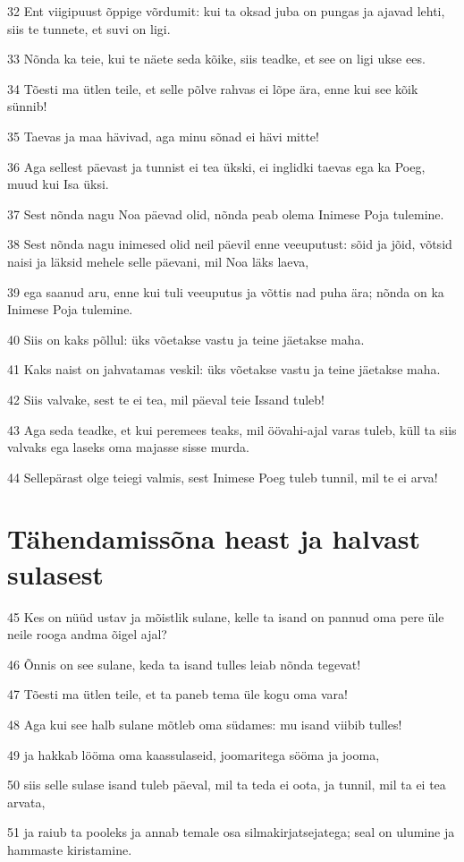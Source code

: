 \par 32 Ent viigipuust õppige võrdumit: kui ta oksad juba on pungas ja ajavad lehti, siis te tunnete, et suvi on ligi.
\par 33 Nõnda ka teie, kui te näete seda kõike, siis teadke, et see on ligi ukse ees.
\par 34 Tõesti ma ütlen teile, et selle põlve rahvas ei lõpe ära, enne kui see kõik sünnib!
\par 35 Taevas ja maa hävivad, aga minu sõnad ei hävi mitte!
\par 36 Aga sellest päevast ja tunnist ei tea ükski, ei inglidki taevas ega ka Poeg, muud kui Isa üksi.
\par 37 Sest nõnda nagu Noa päevad olid, nõnda peab olema Inimese Poja tulemine.
\par 38 Sest nõnda nagu inimesed olid neil päevil enne veeuputust: sõid ja jõid, võtsid naisi ja läksid mehele selle päevani, mil Noa läks laeva,
\par 39 ega saanud aru, enne kui tuli veeuputus ja võttis nad puha ära; nõnda on ka Inimese Poja tulemine.
\par 40 Siis on kaks põllul: üks võetakse vastu ja teine jäetakse maha.
\par 41 Kaks naist on jahvatamas veskil: üks võetakse vastu ja teine jäetakse maha.
\par 42 Siis valvake, sest te ei tea, mil päeval teie Issand tuleb!
\par 43 Aga seda teadke, et kui peremees teaks, mil öövahi-ajal varas tuleb, küll ta siis valvaks ega laseks oma majasse sisse murda.
\par 44 Sellepärast olge teiegi valmis, sest Inimese Poeg tuleb tunnil, mil te ei arva!

\section*{Tähendamissõna heast ja halvast sulasest}

\par 45 Kes on nüüd ustav ja mõistlik sulane, kelle ta isand on pannud oma pere üle neile rooga andma õigel ajal?
\par 46 Õnnis on see sulane, keda ta isand tulles leiab nõnda tegevat!
\par 47 Tõesti ma ütlen teile, et ta paneb tema üle kogu oma vara!
\par 48 Aga kui see halb sulane mõtleb oma südames: mu isand viibib tulles!
\par 49 ja hakkab lööma oma kaassulaseid, joomaritega sööma ja jooma,
\par 50 siis selle sulase isand tuleb päeval, mil ta teda ei oota, ja tunnil, mil ta ei tea arvata,
\par 51 ja raiub ta pooleks ja annab temale osa silmakirjatsejatega; seal on ulumine ja hammaste kiristamine.


